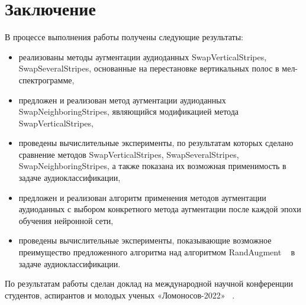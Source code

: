 \documentclass[12pt, fleqn]{article}
\begin{document}
\section{Заключение}

В процессе выполнения работы получены следующие результаты:

\begin{itemize}
    \item реализованы методы аугментации аудиоданных SwapVerticalStripes, \newline SwapSeveralStripes, основанные на перестановке вертикальных полос в мел-спектрограмме,
    \item предложен и реализован метод аугментации аудиоданных SwapNeighboringStripes, являющийся модификацией метода SwapVerticalStripes,
    \item проведены вычислительные эксперименты, по результатам которых сделано сравнение методов SwapVerticalStripes, SwapSeveralStripes, SwapNeighboringStripes, а также показана их возможная применимость в задаче аудиоклассификации,
    \item предложен и реализован алгоритм применения методов аугментации аудиоданных с выбором конкретного метода аугментации после каждой эпохи обучения нейронной сети,
    \item проведены вычислительные эксперименты, показывающие возможное преимущество предложенного алгоритма над алгоритмом RandAugment ~\cite{RandAugment} в задаче аудиоклассификации.
\end{itemize}

По результатам работы сделан доклад на международной научной конференции
студентов, аспирантов и молодых ученых «Ломоносов-2022» ~\cite{Lomonosov}.
\end{document}
